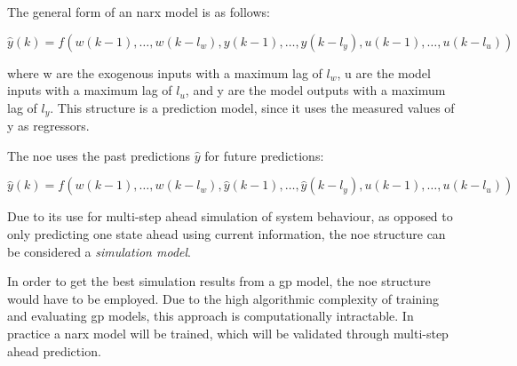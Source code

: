 The general form of an \acrshort{narx} model is as follows:

\begin{equation}
    \hat{y}(k) =
    f(w(k-1),\dots,w(k-l_w),y(k-1),\dots,y(k-l_y),u(k-1),\dots,u(k-l_u))
\end{equation}

where w are the exogenous inputs with a maximum lag of $l_w$, u are the model
inputs with a maximum lag of $l_u$, and y are the model outputs with a maximum
lag of $l_y$. This structure is a prediction model, since it uses the measured
values of y as regressors.

The \acrfull{noe} uses the past predictions $\hat{y}$ for future predictions:

\begin{equation}
    \hat{y}(k) =
    f(w(k-1),\dots,w(k-l_w),\hat{y}(k-1),\dots,\hat{y}(k-l_y),u(k-1),\dots,u(k-l_u))
\end{equation}

Due to its use for multi-step ahead simulation of system behaviour, as opposed
to only predicting one state ahead using current information, the \acrshort{noe}
structure can be considered a \textit{simulation model}.


In order to get the best simulation results from a \acrshort{gp} model, the
\acrshort{noe} structure would have to be employed. Due to the high algorithmic
complexity of training and evaluating \acrshort{gp} models, this approach is
computationally intractable. In practice a \acrshort{narx} model will be trained,
which will be validated through multi-step ahead prediction.

\clearpage
